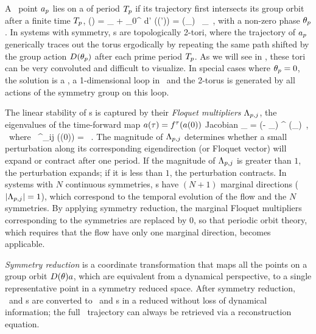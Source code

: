 \documentclass[aip,cha,
reprint,
secnumarabic,
nofootinbib, tightenlines,
nobibnotes, showkeys, showpacs,
superscriptaddress,
]{revtex4-1}
\begin{document}
A \statesp\ point $a_{p}$ lies on a \emph{\rpo} of period
${T_{p}}$ if its trajectory first intersects its group orbit after
a finite time ${T_{p}}$,
\beq
\ssp(\period{\rpprime})
    = \ssp_\rpprime
     + \int_0^\period{\rpprime} \!\!\!\!d\tau' \vel(\ssp (\tau'))
    = \matrixRep(\theta_\rpprime) \,  \ssp_\rpprime
  \,,
with a non-zero phase $\theta_{p}$. In systems with 
symmetry, \rpo s are topologically 2-tori, where the trajectory of
$a_{p}$ generically traces out the torus ergodically by
repeating the same path shifted by the group action
${D}(\theta_{p})$ after each prime period
${T_{p}}$. As we will see in , these tori
can be very convoluted and difficult to visualize. In special cases where
$\theta_{p}=0$, the solution is a \po, a 1-dimensional loop in \statesp\ and
the 2-torus is generated by all actions of the symmetry group on this
loop.

The linear stability of \rpo s is captured by their \emph{Floquet
multipliers}  $\Lambda_{p,j}$, the eigenvalues of the time-forward map
$a(\tau)={f^{\tau}(a(0))}$ Jacobian
\beq
\jMpsRed_{\rpprime}
= \matrixRep(- \theta_\rpprime ) \jMps^\period{\rpprime} (\ssp_\rpprime)
\,, \; \mbox{~where~}\;
\jMps^{\zeit}_{ij} (\ssp(0)) = \, .
The magnitude of $\Lambda_{p,j}$ determines whether a small perturbation
along its corresponding eigendirection (or Floquet vector) will expand or
contract after one period. If the magnitude of $\Lambda_{p,j}$ is
greater than $1$, the perturbation expands; if it is less than $1$, the
perturbation contracts. In systems with $N$ continuous symmetries, \rpo s
have $(N+1)$ marginal directions ($\left|\Lambda_{p,j}\right| = 1$),
which correspond to the temporal evolution of the flow and the $N$
symmetries. By applying symmetry reduction, the marginal Floquet
multipliers corresponding to the symmetries are replaced by $0$, so that 
periodic orbit theory, which requires that the flow have only one
marginal direction, becomes applicable.

\emph{Symmetry reduction} is a coordinate transformation that maps
all the points on a group orbit ${D}(\theta) a$, which are
equivalent from a dynamical perspective, to a single representative point in a symmetry reduced space.
After symmetry reduction, \reqva\ and \rpo s are converted to \eqva\ and \po s in a
reduced \statesp without loss of dynamical information; the full \statesp\
trajectory can always be retrieved via a reconstruction equation. 
\end{document}
